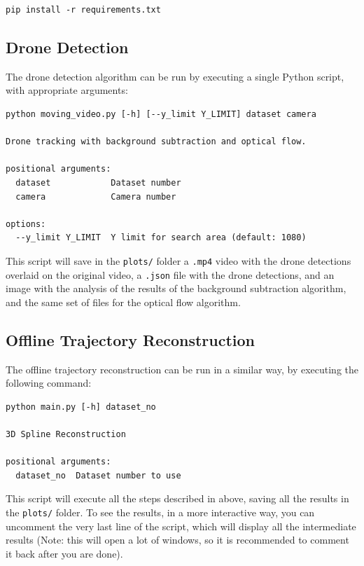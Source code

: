 \documentclass[11pt]{article}
\begin{document}
\begin{verbatim}
pip install -r requirements.txt
\end{verbatim}

\subsection{Drone Detection}

The drone detection algorithm can be run by executing a single Python script, with appropriate arguments:

\begin{verbatim}
python moving_video.py [-h] [--y_limit Y_LIMIT] dataset camera

Drone tracking with background subtraction and optical flow.

positional arguments:
  dataset            Dataset number
  camera             Camera number

options:
  --y_limit Y_LIMIT  Y limit for search area (default: 1080)
\end{verbatim}

This script will save in the \texttt{plots/} folder a \texttt{.mp4} video with the drone detections overlaid on the original video, a \texttt{.json} file with the drone detections, and an image with the analysis of the results of the background subtraction algorithm, and the same set of files for the optical flow algorithm.

\subsection{Offline Trajectory Reconstruction}

The offline trajectory reconstruction can be run in a similar way, by executing the following command:

\begin{verbatim}
python main.py [-h] dataset_no

3D Spline Reconstruction

positional arguments:
  dataset_no  Dataset number to use
\end{verbatim}

This script will execute all the steps described in above, saving all the results in the \texttt{plots/} folder. To see the results, in a more interactive way, you can uncomment the very last line of the script, which will display all the intermediate results (Note: this will open a lot of windows, so it is recommended to comment it back after you are done).
\end{document}
